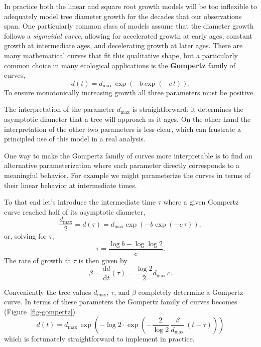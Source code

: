 \documentclass[
  letterpaper,
  DIV=11,
  numbers=noendperiod]{scrartcl}
\begin{document}
In practice both the linear and square root growth models will be too
inflexible to adequately model tree diameter growth for the decades that
our observations span. One particularly common class of models assume
that the diameter growth follows a \emph{sigmoidal curve}, allowing for
accelerated growth at early ages, constant growth at intermediate ages,
and decelerating growth at later ages. There are many mathematical
curves that fit this qualitative shape, but a particularly common choice
in many ecological applications is the \textbf{Gompertz} family of
curves, \[
d(t) = d_{\max} \, \exp( -b \exp( -c \, t) ).
\] To ensure monotonically increasing growth all three parameters must
be positive.

The interpretation of the parameter \(d_{\max}\) is straightforward: it
determines the asymptotic diameter that a tree will approach as it ages.
On the other hand the interpretation of the other two parameters is less
clear, which can frustrate a principled use of this model in a real
analysis.

One way to make the Gompertz family of curves more interpretable is to
find an alternative parameterization where each parameter directly
corresponds to a meaningful behavior. For example we might parameterize
the curves in terms of their linear behavior at intermediate times.

To that end let's introduce the intermediate time \(\tau\) where a given
Gompertz curve reached half of its asymptotic diameter, \[
\frac{ d_{\max} }{ 2 }
= d(\tau)
= d_{\max} \exp( -b \exp( -c \, \tau) ),
\] or, solving for \(\tau\), \[
\tau = \frac{ \log b - \log \log 2 }{ c }.
\] The rate of growth at \(\tau\) is then given by \[
\beta
= \frac{ \mathrm{d} d }{ \mathrm{d} t }(\tau)
= \frac{ \log 2 }{ 2 } d_{\max} \, c.
\]

Conveniently the tree values \(d_{\max}\), \(\tau\), and \(\beta\)
completely determine a Gompertz curve. In terms of these parameters the
Gompertz family of curves becomes (Figure~\ref{fig-gompertz}) \[
d(t) = d_{\max} \,
\exp \left( -\log 2 \cdot
\exp \left( -\frac{2}{\log 2} \, \frac{\beta}{d_{\max}} \,
             \left( t - \tau \right) \right)
\right)
\] which is fortunately straightforward to implement in practice.
\end{document}
